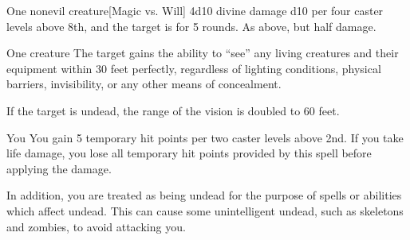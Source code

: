 \begin{spellheader}
    \spellrng{\rngmed}
\end{spellheader}
\begin{spelleffects}
    \begin{spelltarget}{One nonevil creature}[Magic vs. Will]
        \spellsuccess 4d10 divine damage \add d10 per four caster levels above 8th, and the target is \sickened for 5 rounds.
        \spellfailure As above, but half damage.
    \end{spelltarget}
\end{spelleffects}
\begin{spellfooter}
    
\end{spellfooter}

\begin{spellheader}
    \spelldur{\durlong \dismissable}
\end{spellheader}
\begin{spelleffects}
    \begin{spelltarget}{One creature}
        \spelleffect The target gains the ability to ``see'' any living creatures and their equipment within 30 feet perfectly, regardless of lighting conditions, physical barriers, invisibility, or any other means of concealment.

        If the target is undead, the range of the vision is doubled to 60 feet.
    \end{spelltarget}
\end{spelleffects}
\begin{spellfooter}
    
\end{spellfooter}

\begin{spellheader}
    \spelldur{\durlong}
\end{spellheader}
\begin{spelleffects}
    \begin{spelltarget}{You}
        \spelleffect You gain 5 temporary hit points  per two caster levels above 2nd. If you take life damage, you lose all temporary hit points provided by this spell before applying the damage.

        In addition, you are treated as being undead for the purpose of spells or abilities which affect undead. This can cause some unintelligent undead, such as skeletons and zombies, to avoid attacking you.
    \end{spelltarget}
\end{spelleffects}
\begin{spellfooter}
    
\end{spellfooter}


